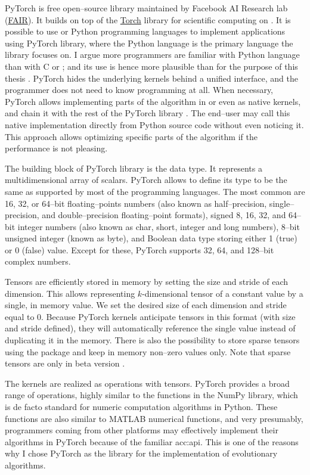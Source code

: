 PyTorch is free open--source library maintained by Facebook AI Research lab (\href{https://ai.facebook.com/}{FAIR}). It builds on top of the \href{http://torch.ch/}{Torch} library for scientific computing on \gpuns. It is possible to use \cpp or Python programming languages to implement applications using PyTorch library, where the Python language is the primary language the library focuses on. I argue more programmers are familiar with Python language than with C or \cppns; and its use is hence more plausible than \cuda for the purpose of this thesis \citep{StackOverflowSurvey}. PyTorch hides the underlying kernels behind a unified interface, and the programmer does not need to know \cuda programming at all. When necessary, PyTorch allows implementing parts of the algorithm in \cpp or even as native \cuda kernels, and chain it with the rest of the PyTorch library \citep{PyTorchDoc}. The end--user may call this native implementation directly from Python source code without even noticing it. This approach allows optimizing specific parts of the algorithm if the performance is not pleasing.

The building block of PyTorch library is the  data type. It represents a multidimensional array of scalars. PyTorch allows to define its type to be the same as supported by most of the programming languages. The most common are 16, 32, or 64--bit floating--points numbers (also known as half--precision, single--precision, and double--precision floating--point formats), signed 8, 16, 32, and 64--bit integer numbers (also known as char, short, integer and long numbers), 8--bit unsigned integer (known as byte), and Boolean data type storing either 1 (true) or 0 (false) value. Except for these, PyTorch supports 32, 64, and 128--bit complex numbers.

Tensors are efficiently stored in memory by setting the size and stride of each dimension. This allows representing $k$-dimensional tensor of a constant value by a single, in memory value. We set the desired size of each dimension and stride equal to $0$. Because PyTorch kernels anticipate tensors in this format (with size and stride defined), they will automatically reference the single value instead of duplicating it in the memory. There is also the possibility to store sparse tensors using the  package and keep in memory non--zero values only. Note that sparse tensors are only in beta version \citep{PyTorchDoc}.

The kernels are realized as operations with tensors. PyTorch provides a broad range of operations, highly similar to the functions in the NumPy library, which is de facto standard for numeric computation algorithms in Python. These functions are also similar to MATLAB numerical functions, and very presumably, programmers coming from other platforms may effectively implement their algorithms in PyTorch because of the familiar \acrshort{acc:api}. This is one of the reasons why I chose PyTorch as the library for the implementation of evolutionary algorithms.

